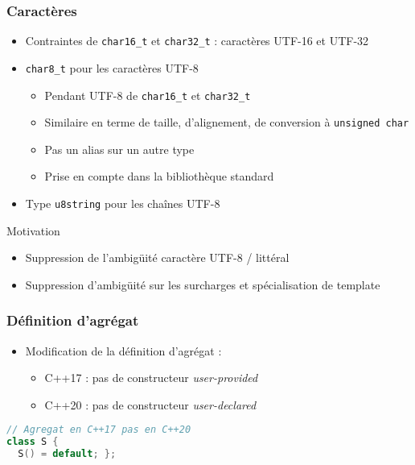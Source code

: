 \documentclass[C++.tex]{subfiles}
\begin{document}
\begin{frame}[fragile]
	\frametitle{Caractères}
	\begin{itemize}
		\item Contraintes de \lstinline|char16_t| et \lstinline|char32_t| : caractères UTF-16 et UTF-32


		\item \lstinline|char8_t| pour les caractères UTF-8
		\begin{itemize}
			\item Pendant UTF-8 de \lstinline|char16_t| et \lstinline|char32_t|
			\item Similaire en terme de taille, d'alignement, de conversion à \lstinline|unsigned char|
			\item Pas un alias sur un autre type
			\item Prise en compte dans la bibliothèque standard
		\end{itemize}
		\item Type \lstinline|u8string| pour les chaînes UTF-8
	\end{itemize}

	\begin{block}{Motivation}
		\begin{itemize}
			\item Suppression de l'ambigüité caractère UTF-8 / littéral


			\item Suppression d'ambigüité sur les surcharges et spécialisation de template
		\end{itemize}
	\end{block}
\end{frame}

\begin{frame}[fragile]
	\frametitle{Définition d'agrégat}
	\begin{itemize}
		\item Modification de la définition d'agrégat :
		\begin{itemize}
			\item C++17 : pas de constructeur \textit{user-provided}
			\item C++20 : pas de constructeur \textit{user-declared}

		\end{itemize}
	\end{itemize}

	\begin{lstlisting}[language=C++]
// Agregat en C++17 pas en C++20
class S {
  S() = default; };\end{lstlisting}
\end{frame}
\end{document}
